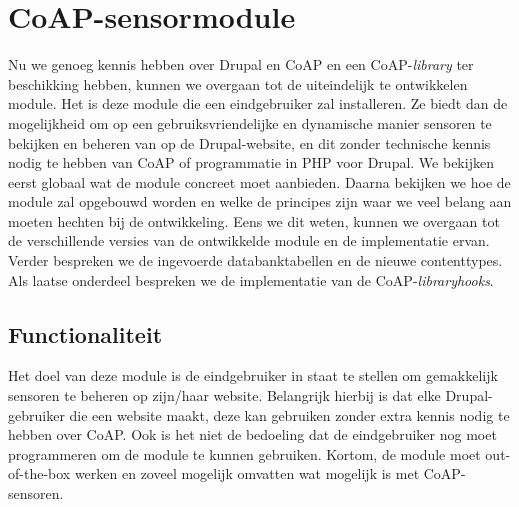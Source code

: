 \chapter{CoAP-sensormodule} \label{sensormodule}

Nu we genoeg kennis hebben over Drupal en CoAP en een CoAP-\textit{library} ter beschikking hebben, kunnen we overgaan tot de uiteindelijk te ontwikkelen module. Het is deze module die een eindgebruiker zal installeren. Ze biedt dan de mogelijkheid om op een gebruiksvriendelijke en dynamische manier sensoren te bekijken en beheren van op de Drupal-website, en dit zonder technische kennis nodig te hebben van CoAP of programmatie in PHP voor Drupal. We bekijken eerst globaal wat de module concreet moet aanbieden. Daarna bekijken we hoe de module zal opgebouwd worden en welke de principes zijn waar we veel belang aan moeten hechten bij de ontwikkeling. Eens we dit weten, kunnen we overgaan tot de verschillende versies van de ontwikkelde module en de implementatie ervan. Verder bespreken we de ingevoerde databanktabellen en de nieuwe contenttypes. Als laatse onderdeel bespreken we de implementatie van de CoAP-\textit{library}\textit{hooks}.

\section{Functionaliteit}

Het doel van deze module is de eindgebruiker in staat te stellen om gemakkelijk sensoren te beheren op zijn/haar website. Belangrijk hierbij is dat elke Drupal-gebruiker die een website maakt, deze kan gebruiken zonder extra kennis nodig te hebben over CoAP. Ook is het niet de bedoeling dat de eindgebruiker nog moet programmeren om de module te kunnen gebruiken. Kortom, de module moet out-of-the-box werken en zoveel mogelijk omvatten wat mogelijk is met CoAP-sensoren.\\

